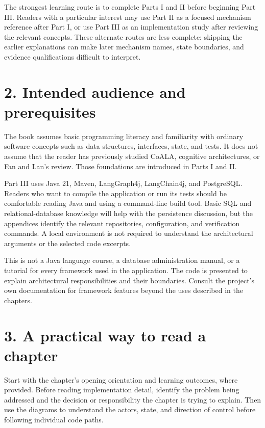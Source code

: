 The strongest learning route is to complete Parts I and II before beginning Part III. Readers with a particular interest may use Part II as a focused mechanism reference after Part I, or use Part III as an implementation study after reviewing the relevant concepts. These alternate routes are less complete: skipping the earlier explanations can make later mechanism names, state boundaries, and evidence qualifications difficult to interpret.

\section*{2. Intended audience and prerequisites}

The book assumes basic programming literacy and familiarity with ordinary software concepts such as data structures, interfaces, state, and tests. It does not assume that the reader has previously studied CoALA, cognitive architectures, or Fan and Lan's review. Those foundations are introduced in Parts I and II.

Part III uses Java 21, Maven, LangGraph4j, LangChain4j, and PostgreSQL. Readers who want to compile the application or run its tests should be comfortable reading Java and using a command-line build tool. Basic SQL and relational-database knowledge will help with the persistence discussion, but the appendices identify the relevant repositories, configuration, and verification commands. A local environment is not required to understand the architectural arguments or the selected code excerpts.

This is not a Java language course, a database administration manual, or a tutorial for every framework used in the application. The code is presented to explain architectural responsibilities and their boundaries. Consult the project's own documentation for framework features beyond the uses described in the chapters.

\section*{3. A practical way to read a chapter}

Start with the chapter's opening orientation and learning outcomes, where provided. Before reading implementation detail, identify the problem being addressed and the decision or responsibility the chapter is trying to explain. Then use the diagrams to understand the actors, state, and direction of control before following individual code paths.

